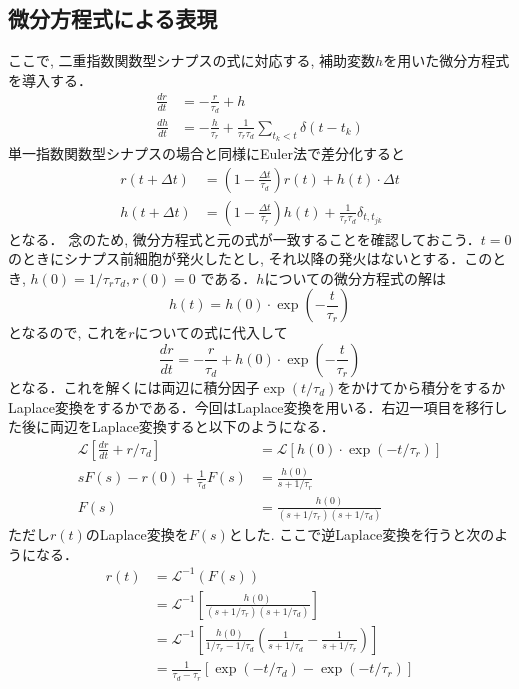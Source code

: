 \subsection{微分方程式による表現}
ここで, 二重指数関数型シナプスの式に対応する, 補助変数$h$を用いた微分方程式を導入する． 
\begin{align} 
\frac{dr}{dt}&=-\frac{r}{\tau_{d}}+h\\
\frac{dh}{dt}&=-\frac{h}{\tau_{r}}+\frac{1}{\tau_{r} \tau_{d}} \sum_{t_{k}< t} \delta\left(t-t_{k}\right) 
\end{align} 
単一指数関数型シナプスの場合と同様にEuler法で差分化すると 
\begin{align} 
r(t+\Delta t)&=\left(1-\frac{\Delta t}{\tau_{d}}\right)r(t)+h(t)\cdot \Delta t\\ 
h(t+\Delta t)&=\left(1-\frac{\Delta t}{\tau_{r}}\right)h(t)+\frac{1}{\tau_{r}\tau_{d}} \delta_{t,t_{j k}}
\end{align}
となる．
念のため, 微分方程式と元の式が一致することを確認しておこう．$t=0$のときにシナプス前細胞が発火したとし, それ以降の発火はないとする．このとき, $h(0)=1/\tau_{r}\tau_{d}, r(0)=0$ である．$h$についての微分方程式の解は
\begin{equation}
h(t)=h(0)\cdot \exp\left(-\frac{t}{\tau_r}\right)    
\end{equation}
となるので, これを$r$についての式に代入して
\begin{equation}
\frac{dr}{dt}=-\frac{r}{\tau_{d}}+h(0)\cdot \exp\left(-\frac{t}{\tau_r}\right) 
\end{equation}
となる．これを解くには両辺に積分因子$\exp({t}/{\tau_d})$をかけてから積分をするかLaplace変換をするかである．今回はLaplace変換を用いる．右辺一項目を移行した後に両辺をLaplace変換すると以下のようになる．
\begin{align}
\mathcal{L}\left[\frac{dr}{dt}+r/\tau_{d}\right]&=\mathcal{L}\left[h(0)\cdot \exp\left(-t/\tau_r\right)\right]\\
sF(s)-r(0)+\frac{1}{\tau_{d}}F(s)&=\frac{h(0)}{s+1/\tau_r}\\
F(s)&=\frac{h(0)}{(s+1/\tau_r)(s+1/\tau_d)}
\end{align}
ただし$r(t)$のLaplace変換を$F(s)$とした. ここで逆Laplace変換を行うと次のようになる．
\begin{align}
r(t)&=\mathcal{L}^{-1}(F(s))\\
&=\mathcal{L}^{-1}\left[\frac{h(0)}{(s+1/\tau_r)(s+1/\tau_d)}\right]\\
&=\mathcal{L}^{-1}\left[\frac{h(0)}{1/\tau_r-1/\tau_d}\left(\frac{1}{s+1/\tau_d}-\frac{1}{s+1/\tau_r}\right)\right]\\
&=\frac{1}{\tau_d-\tau_r}\left[\exp(-t/\tau_d)-\exp(-t/\tau_r)\right]
\end{align}
